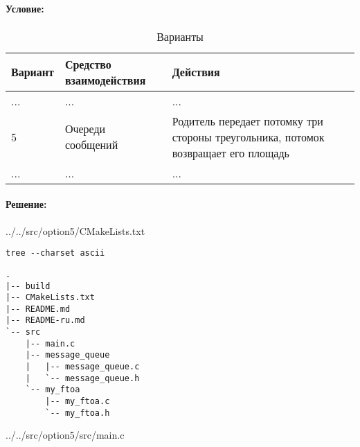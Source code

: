 \paragraph{Условие:} \hspace{0pt}

\begin{table}[h]
    \centering{}
    \caption{Варианты}
    \label{table:name}

    \begin{tabular}{|l|l|p{10cm}|}
        \hline
        Вариант &   Средство взаимодействия &   Действия    \\  \hline
        \hline
        ...     &   ...                     &   ...         \\  \hline
        5       &   Очереди сообщений       & Родитель передает потомку три стороны треугольника, потомок возвращает его площадь    \\  \hline
        ...     &   ...                     &   ...         \\  \hline
    \end{tabular}
\end{table}

\paragraph{Решение:} \hspace{0pt}

\noindent\begin{minipage}{.47\textwidth}
    
    {../../src/option5/CMakeLists.txt}
\end{minipage}
\hfill
\begin{minipage}{.47\textwidth}
    \begin{lstlisting}[language=Terminal,]
tree --charset ascii
\end{lstlisting}
    \begin{lstlisting}[language=Out,]
.
|-- build
|-- CMakeLists.txt
|-- README.md
|-- README-ru.md
`-- src
    |-- main.c
    |-- message_queue
    |   |-- message_queue.c
    |   `-- message_queue.h
    `-- my_ftoa
        |-- my_ftoa.c
        `-- my_ftoa.h
\end{lstlisting}
\end{minipage}

\newpage


{../../src/option5/src/main.c}

\newpage

